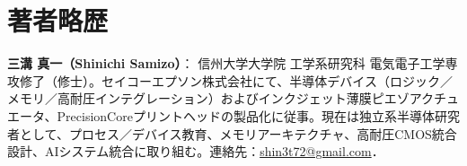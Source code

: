\documentclass[twocolumn]{ieeetran}
\begin{document}
\section*{著者略歴}
\noindent\textbf{三溝 真一（Shinichi Samizo）}：
信州大学大学院 工学系研究科 電気電子工学専攻修了（修士）。セイコーエプソン株式会社にて、半導体デバイス（ロジック／メモリ／高耐圧インテグレーション）およびインクジェット薄膜ピエゾアクチュエータ、PrecisionCoreプリントヘッドの製品化に従事。現在は独立系半導体研究者として、プロセス／デバイス教育、メモリアーキテクチャ、高耐圧CMOS統合設計、AIシステム統合に取り組む。連絡先：\href{mailto:shin3t72@gmail.com}{shin3t72@gmail.com}．
\end{document}
